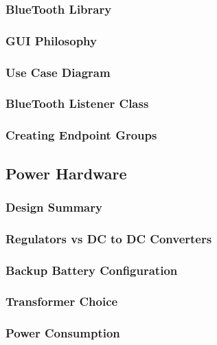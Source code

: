 \subsubsection{BlueTooth Library}

\subsubsection{GUI Philosophy}

\subsubsection{Use Case Diagram}

\subsubsection{BlueTooth Listener Class}

\subsubsection{Creating Endpoint Groups}

\subsection{Power Hardware}

\subsubsection{Design Summary}

\subsubsection{Regulators vs DC to DC Converters}

\subsubsection{Backup Battery Configuration}

\subsubsection{Transformer Choice}

\subsubsection{Power Consumption}

